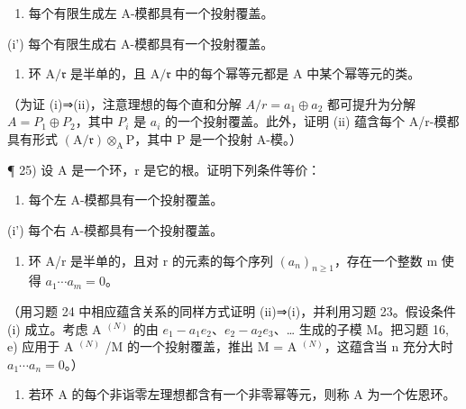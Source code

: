\begin{enumerate}
\def\labelenumi{(\roman{enumi})}
\tightlist
\item
  每个有限生成左 A-模都具有一个投射覆盖。
\end{enumerate}

(i') 每个有限生成右 A-模都具有一个投射覆盖。

\begin{enumerate}
\def\labelenumi{(\roman{enumi})}
\setcounter{enumi}{1}
\tightlist
\item
  环 \(\mathrm{A} / \mathfrak{r}\) 是半单的，且 \(\mathrm{A} / \mathfrak{r}\) 中的每个幂等元都是 \(\mathrm{A}\) 中某个幂等元的类。
\end{enumerate}

（为证 (i)⇒(ii)，注意理想的每个直和分解 \(A/r = a_{1} \oplus a_{2}\) 都可提升为分解 \(A = P_{1} \oplus P_{2}\)，其中 \(P_{i}\) 是 \(a_{i}\) 的一个投射覆盖。此外，证明 (ii) 蕴含每个 A/r-模都具有形式 \((\mathrm{A}/\mathfrak{r}) \otimes_{\mathrm{A}} \mathrm{P}\)，其中 P 是一个投射 A-模。）

¶ 25) 设 A 是一个环，r 是它的根。证明下列条件等价：

\begin{enumerate}
\def\labelenumi{(\roman{enumi})}
\tightlist
\item
  每个左 A-模都具有一个投射覆盖。
\end{enumerate}

(i') 每个右 A-模都具有一个投射覆盖。

\begin{enumerate}
\def\labelenumi{(\roman{enumi})}
\setcounter{enumi}{1}
\tightlist
\item
  环 A/r 是半单的，且对 r 的元素的每个序列 \((a_{n})_{n\geqslant1}\)，存在一个整数 m 使得 \(a_{1}\cdots a_{m}=0\)。
\end{enumerate}

（用习题 24 中相应蕴含关系的同样方式证明 (ii)⇒(i)，并利用习题 23。假设条件 (i) 成立。考虑 A \(^{(N)}\) 的由 \(e_1 - a_1e_2\)、\(e_2 - a_2e_3\)、\ldots{} 生成的子模 M。把习题 16, e) 应用于 A \(^{(N)}\) /M 的一个投射覆盖，推出 M = A \(^{(N)}\)，这蕴含当 n 充分大时 \(a_1 \cdots a_n = 0\)。）

\begin{enumerate}
\def\labelenumi{\arabic{enumi})}
\setcounter{enumi}{25}
\tightlist
\item
  若环 A 的每个非诣零左理想都含有一个非零幂等元，则称 A 为一个佐恩环。
\end{enumerate}

